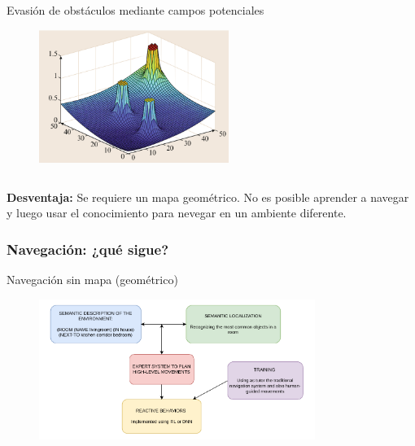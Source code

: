 \begin{frame}
\begin{columns}
\begin{column}{0.5\textwidth}
\begin{figure}
      \end{figure}
      Evasión de obstáculos mediante campos potenciales
      \begin{figure}
        \centering
        \includegraphics[width=0.55\textwidth]{Figures/MotionPlanning/PotFields.png}
      \end{figure}
    \end{column}
  \end{columns}
  \textbf{Desventaja:} Se requiere un mapa geométrico. No es posible aprender a navegar y luego usar el conocimiento para nevegar en un ambiente diferente. 
\end{frame}

\begin{frame}\frametitle{Navegación: ¿qué sigue?}
  Navegación sin mapa (geométrico)
  \begin{figure}
    \centering
    \includegraphics[width=0.8\textwidth]{Figures/MotionPlanning/MaplessNavigation.pdf}
  \end{figure}
\end{frame}


